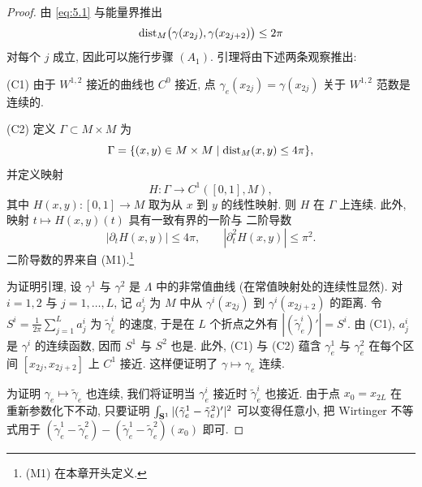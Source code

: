 \begin{proof}
由 \eqref{eq:5.1} 与能量界推出
\begin{equation}
\operatorname{dist}_M\bigl(\gamma(x_{2j}),\gamma(x_{2j+2})\bigr)\leq 2\pi
\label{eq:5.18}
\end{equation}
对每个 $j$ 成立, 因此可以施行步骤 $(A_1)$. 引理将由下述两条观察推出:

(C1) 由于 $W^{1,2}$ 接近的曲线也 $C^0$ 接近, 点
$\gamma_e(x_{2j})=\gamma(x_{2j})$ 关于 $W^{1,2}$ 范数是连续的.

(C2) 定义 $\Gamma\subset M\times M$ 为
\begin{equation*}
\Gamma=\{(x,y)\in M\times M\mid \operatorname{dist}_M(x,y)\leq 4\pi\},
\end{equation*}
并定义映射
\begin{equation*}
H:\Gamma\to C^1([0,1],M),
\end{equation*}
其中 $H(x,y):[0,1]\to M$ 取为从 $x$ 到 $y$ 的线性映射. 则 $H$ 在
$\Gamma$ 上连续. 此外, 映射 $t\mapsto H(x,y)(t)$ 具有一致有界的一阶与
二阶导数
\begin{equation*}
|\partial_t H(x,y)|\leq 4\pi,\qquad
|\partial_t^2 H(x,y)|\leq\pi^2.
\end{equation*}
二阶导数的界来自 (M1).\footnote{(M1) 在本章开头定义.}

为证明引理, 设 $\gamma^1$ 与 $\gamma^2$ 是 $\Lambda$ 中的非常值曲线
(在常值映射处的连续性显然). 对 $i=1,2$ 与 $j=1,\dots,L$, 记 $a_j^i$ 为
$M$ 中从 $\gamma^i(x_{2j})$ 到 $\gamma^i(x_{2j+2})$ 的距离. 令
$S^i=\frac1{2\pi}\sum_{j=1}^La_j^i$ 为 $\tilde{\gamma}_e^i$ 的速度,
于是在 $L$ 个折点之外有 $|(\tilde{\gamma}_e^i)'|=S^i$. 由 (C1),
$a_j^i$ 是 $\gamma^i$ 的连续函数, 因而 $S^1$ 与 $S^2$ 也是. 此外,
(C1) 与 (C2) 蕴含 $\gamma_e^1$ 与 $\gamma_e^2$ 在每个区间
$[x_{2j},x_{2j+2}]$ 上 $C^1$ 接近. 这样便证明了 $\gamma\mapsto\gamma_e$
连续.

为证明 $\gamma_e\mapsto\tilde{\gamma}_e$ 也连续, 我们将证明当
$\gamma_e^i$ 接近时 $\tilde{\gamma}_e^i$ 也接近. 由于点 $x_0=x_{2L}$ 在
重新参数化下不动, 只要证明 $\int_{\mathbf{S}^1}|(\tilde{\gamma}_e^1
-\tilde{\gamma}_e^2)'|^2$ 可以变得任意小, 把 Wirtinger 不等式用于
$(\tilde{\gamma}_e^1-\tilde{\gamma}_e^2)
-(\tilde{\gamma}_e^1-\tilde{\gamma}_e^2)(x_0)$ 即可.


\end{proof}
